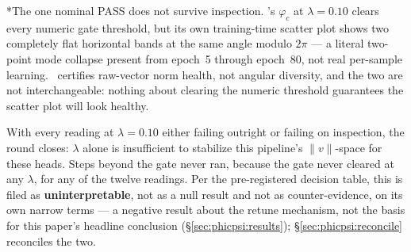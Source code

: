 *The one nominal PASS does not survive inspection.
\pocB's $\varphi_c$ at $\lambda=0.10$ clears every numeric gate threshold, but its own training-time scatter plot shows two completely flat horizontal bands at the same angle modulo $2\pi$ --- a literal two-point mode collapse present from epoch~5 through epoch~80, not real per-sample learning.
\stdratio\ certifies raw-vector norm health, not angular diversity, and the two are not interchangeable: nothing about clearing the numeric threshold guarantees the scatter plot will look healthy.

With every reading at $\lambda=0.10$ either failing outright or failing on inspection, the round closes: $\lambda$ alone is insufficient to stabilize this pipeline's $\|v\|$-space for these heads.
Steps beyond the gate never ran, because the gate never cleared at any $\lambda$, for any of the twelve readings.
Per the pre-registered decision table, this is filed as \textbf{uninterpretable}, not as a null result and not as counter-evidence, on its own narrow terms --- a negative result about the retune mechanism, not the basis for this paper's headline conclusion (\S\ref{sec:phicpsi:results}); \S\ref{sec:phicpsi:reconcile} reconciles the two.
